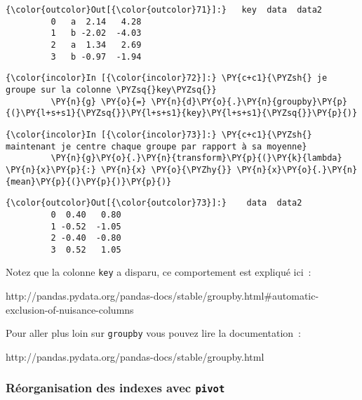 \begin{Verbatim}[commandchars=\\\{\},frame=single,framerule=0.3mm,rulecolor=\color{cellframecolor}]
{\color{outcolor}Out[{\color{outcolor}71}]:}   key  data  data2
         0   a  2.14   4.28
         1   b -2.02  -4.03
         2   a  1.34   2.69
         3   b -0.97  -1.94
\end{Verbatim}
            
    \begin{Verbatim}[commandchars=\\\{\},frame=single,framerule=0.3mm,rulecolor=\color{cellframecolor}]
{\color{incolor}In [{\color{incolor}72}]:} \PY{c+c1}{\PYZsh{} je groupe sur la colonne \PYZsq{}key\PYZsq{}}
         \PY{n}{g} \PY{o}{=} \PY{n}{d}\PY{o}{.}\PY{n}{groupby}\PY{p}{(}\PY{l+s+s1}{\PYZsq{}}\PY{l+s+s1}{key}\PY{l+s+s1}{\PYZsq{}}\PY{p}{)}
\end{Verbatim}


    \begin{Verbatim}[commandchars=\\\{\},frame=single,framerule=0.3mm,rulecolor=\color{cellframecolor}]
{\color{incolor}In [{\color{incolor}73}]:} \PY{c+c1}{\PYZsh{} maintenant je centre chaque groupe par rapport à sa moyenne}
         \PY{n}{g}\PY{o}{.}\PY{n}{transform}\PY{p}{(}\PY{k}{lambda} \PY{n}{x}\PY{p}{:} \PY{n}{x} \PY{o}{\PYZhy{}} \PY{n}{x}\PY{o}{.}\PY{n}{mean}\PY{p}{(}\PY{p}{)}\PY{p}{)}
\end{Verbatim}


\begin{Verbatim}[commandchars=\\\{\},frame=single,framerule=0.3mm,rulecolor=\color{cellframecolor}]
{\color{outcolor}Out[{\color{outcolor}73}]:}    data  data2
         0  0.40   0.80
         1 -0.52  -1.05
         2 -0.40  -0.80
         3  0.52   1.05
\end{Verbatim}
            
    Notez que la colonne \texttt{key} a disparu, ce comportement est
expliqué ici~:

http://pandas.pydata.org/pandas-docs/stable/groupby.html\#automatic-exclusion-of-nuisance-columns

Pour aller plus loin sur \texttt{groupby} vous pouvez lire la
documentation~:

http://pandas.pydata.org/pandas-docs/stable/groupby.html

    \hypertarget{ruxe9organisation-des-indexes-avec-pivot}{%
\subsubsection{\texorpdfstring{Réorganisation des indexes avec
\texttt{pivot}}{Réorganisation des indexes avec pivot}}\label{ruxe9organisation-des-indexes-avec-pivot}}

